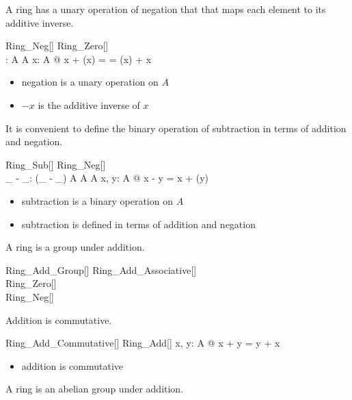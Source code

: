 \documentclass{amsart}
\begin{document}
A ring has a unary operation of negation that that maps each element to its additive inverse.

\begin{schema}{Ring\_Neg}[\genT]
	Ring\_Zero[\genT] \\
	\ringNeg: \genT \pfun \genT
\where
	\ringNeg \in A \fun A
\also
	\forall x: A @ x + (\ringNeg x) = \ringZero = (\ringNeg x) + x
\end{schema}

\begin{itemize}
	\item negation is a unary operation on $A$
	\item $- x$ is the additive inverse of $x$
\end{itemize}

It is convenient to define the binary operation of subtraction in terms of addition and negation.

\begin{schema}{Ring\_Sub}[\genT]
	Ring\_Neg[\genT] \\
	\_ - \_: \genT \cross \genT \pfun \genT
\where
	(\_ - \_) \in A \cross A \fun A
\also
	\forall x, y: A @ x - y = x + (\ringNeg y)
\end{schema}

\begin{itemize}
	\item subtraction is a binary operation on $A$
	\item subtraction is defined in terms of addition and negation
\end{itemize}

A ring is a group under addition.

\begin{schema}{Ring\_Add\_Group}[\genT]
	Ring\_Add\_Associative[\genT] \\
	Ring\_Zero[\genT] \\
	Ring\_Neg[\genT]
\end{schema}

Addition is commutative.

\begin{schema}{Ring\_Add\_Commutative}[\genT]
	Ring\_Add[\genT]
\where
	\forall x, y: A @ x + y = y + x
\end{schema}

\begin{itemize}
	\item addition is commutative
\end{itemize}

A ring is an abelian group under addition.
\end{document}
